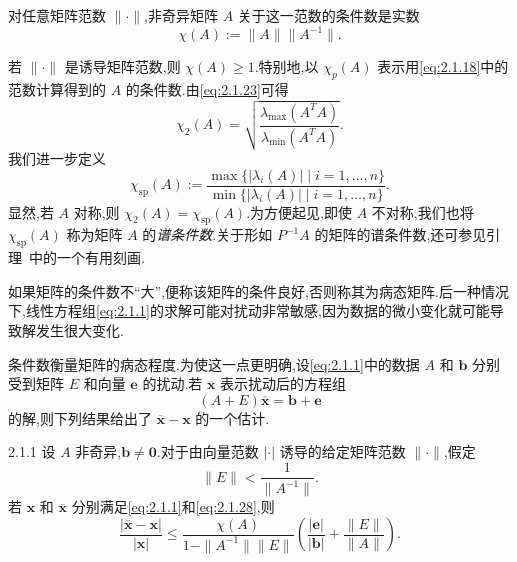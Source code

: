 \begin{definition*}[条件数]
对任意矩阵范数 \(\|\cdot\|\),非奇异矩阵 \(A\) 关于这一范数的条件数是实数
\begin{equation}\label{eq:2.1.25}
  \chi(A):=\|A\|\|A^{-1}\|.
\end{equation}
\end{definition*}

若 \(\|\cdot\|\) 是诱导矩阵范数,则 \(\chi(A)\ge1\).特别地,以 \(\chi_p(A)\) 表示用\eqref{eq:2.1.18}中的范数计算得到的 \(A\) 的条件数.由\eqref{eq:2.1.23}可得
\begin{equation}\label{eq:2.1.26}
  \chi_2(A)=\sqrt{\frac{\lambda_{\max}(A^TA)}{\lambda_{\min}(A^TA)}}.
\end{equation}
我们进一步定义
\begin{equation}\label{eq:2.1.27}
  \chi_{\mathrm{sp}}(A):=
  \frac{\max\bigl\{|\lambda_i(A)|\mid i=1,\ldots,n\bigr\}}
       {\min\bigl\{|\lambda_i(A)|\mid i=1,\ldots,n\bigr\}}.
\end{equation}
显然,若 \(A\) 对称,则 \(\chi_2(A)=\chi_{\mathrm{sp}}(A)\).为方便起见,即使 \(A\) 不对称,我们也将 \(\chi_{\mathrm{sp}}(A)\) 称为矩阵 \(A\) 的\emph{谱条件数}.关于形如 \(P^{-1}A\) 的矩阵的谱条件数,还可参见引理~中的一个有用刻画.

如果矩阵的条件数不“大”,便称该矩阵的条件良好,否则称其为病态矩阵.后一种情况下,线性方程组\eqref{eq:2.1.1}的求解可能对扰动非常敏感,因为数据的微小变化就可能导致解发生很大变化.

条件数衡量矩阵的病态程度.为使这一点更明确,设\eqref{eq:2.1.1}中的数据 \(A\) 和 \(\boldsymbol{b}\) 分别受到矩阵 \(E\) 和向量 \(\boldsymbol{e}\) 的扰动.若 \(\overline{\boldsymbol{x}}\) 表示扰动后的方程组
\begin{equation}\label{eq:2.1.28}
  (A+E)\overline{\boldsymbol{x}}=\boldsymbol{b}+\boldsymbol{e}
\end{equation}
的解,则下列结果给出了 \(\overline{\boldsymbol{x}}-\boldsymbol{x}\) 的一个估计.

\begin{proposition}[]{2.1.1}
设 \(A\) 非奇异,\(\boldsymbol{b}\ne\boldsymbol{0}\).对于由向量范数 \(|\cdot|\) 诱导的给定矩阵范数 \(\|\cdot\|\),假定
\begin{equation}\label{eq:2.1.29}
  \|E\|<\frac1{\|A^{-1}\|}.
\end{equation}
若 \(\boldsymbol{x}\) 和 \(\overline{\boldsymbol{x}}\) 分别满足\eqref{eq:2.1.1}和\eqref{eq:2.1.28},则
\begin{equation}\label{eq:2.1.30}
  \frac{|\overline{\boldsymbol{x}}-\boldsymbol{x}|}{|\boldsymbol{x}|}
  \le\frac{\chi(A)}{1-\|A^{-1}\|\|E\|}
  \left(\frac{|\boldsymbol{e}|}{|\boldsymbol{b}|}+\frac{\|E\|}{\|A\|}\right).
\end{equation}
\end{proposition}

